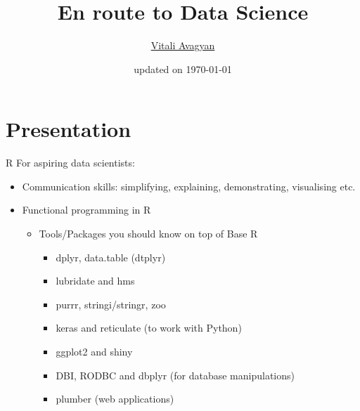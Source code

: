 \documentclass[compress,brown]{beamer}
\title{En route to Data Science}
\author{\href{https://www.linkedin.com/in/vitali-avagyan-a1566234/}{Vitali Avagyan}}
\institute{Data Scientist \\TurinTech \\London, UK}
\date{updated on \today}
\begin{document}
	\frame{
		\titlepage 
	}

\section{Presentation}

\begin{frame}{R}
For aspiring data scientists:
\begin{itemize}
	\item Communication skills: simplifying, explaining, demonstrating, visualising etc.
	\item Functional programming in R
	\begin{itemize}
		\item Tools/Packages you should know on top of Base R
		\begin{itemize}
			\item dplyr, data.table (dtplyr)
			\item lubridate and hms
			\item purrr, stringi/stringr, zoo
			\item keras and reticulate (to work with Python)
			\item ggplot2 and shiny
			\item DBI, RODBC and dbplyr (for database manipulations)
			\item plumber (web applications)
		\end{itemize}
	\end{itemize}
\end{itemize}
\end{frame}
\end{document}
